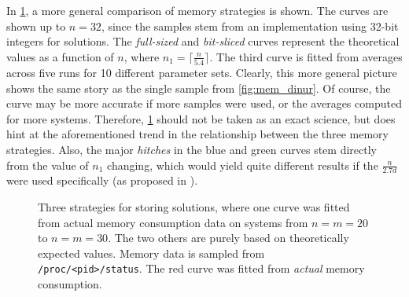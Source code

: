 In \cref{fig:three_mem}, a more general comparison of memory strategies is shown. The curves are shown up to $n = 32$, since the samples stem from an implementation using 32-bit integers for solutions. The \textit{full-sized} and \textit{bit-sliced} curves represent the theoretical values as a function of $n$, where $n_1 = \lceil \frac{n}{5.4} \rceil$. The third curve is fitted from averages across five runs for 10 different parameter sets. Clearly, this more general picture shows the same story as the single sample from \cref{fig:mem_dinur}. Of course, the curve may be more accurate if more samples were used, or the averages computed for more systems. Therefore, \cref{fig:three_mem} should not be taken as an exact science, but does hint at the aforementioned trend in the relationship between the three memory strategies. Also, the major \textit{hitches} in the blue and green curves stem directly from the value of $n_1$ changing, which would yield quite different results if the $\frac{n}{2.7d}$ were used specifically (as proposed in \cite{eurocrypt-2021-30841}).

\begin{figure}[t]
    \centering
    \caption{Three strategies for storing solutions, where one curve was fitted from actual memory consumption data on systems from $n = m = 20$ to $n = m = 30$. The two others are purely based on theoretically expected values. Memory data is sampled from \texttt{/proc/<pid>/status}. The red curve was fitted from \textit{actual} memory consumption.} \label{fig:three_mem}
\end{figure}

